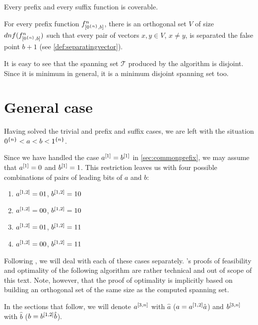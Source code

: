 \begin{corollary}
\label{corollary:prefixsuffixcoverable}
Every prefix and every suffix function is coverable.
\end{corollary}

\begin{corollary}
\label{corollary:prefixdependence}
For every prefix function $f^{n}_{[0^{\{n\}}, b]}$,
there is an orthogonal set $V$
of size $dnf(f^{n}_{[0^{\{n\}}, b]})$
such that
every pair of vectors $x,y \in V$, $x \neq y$,
is separated the false point $b+1$
(see \cref{def:separatingvector}).
\end{corollary}

It is easy to see that the spanning set $\mathcal{T}$
produced by the algorithm is disjoint.
Since it is minimum in general,
it is a minimum disjoint spanning set too.

\section{General case}
\label{sec:1intervalgeneral}

Having solved the trivial and prefix and suffix cases,
we are left with the situation
$0^{\{n\}} < a < b < 1^{\{n\}}$.

Since we have handled the case $a^{[1]} = b^{[1]}$
in \cref{sec:commonprefix},
we may assume that $a^{[1]} = 0$ and $b^{[1]} = 1$.
This restriction leaves us with
four possible combinations of pairs
of leading bits of $a$ and $b$:

\begin{enumerate}
\item $a^{[1, 2]} = 01$, $b^{[1, 2]} = 10$
\item $a^{[1, 2]} = 00$, $b^{[1, 2]} = 10$
\item $a^{[1, 2]} = 01$, $b^{[1, 2]} = 11$
\item $a^{[1, 2]} = 00$, $b^{[1, 2]} = 11$
\end{enumerate}

Following \citet{Schieber2005154},
we will deal with each of these cases separately.
\citeauthor{Schieber2005154}'s proofs of feasibility
and optimality of the following
algorithm are rather technical and out of scope
of this text.
Note, however, that the proof of optimality is implicitly
based on building an orthogonal set of the same size
as the computed spanning set.

In the sections that follow,
we will denote $a^{[3, n]}$ with $\hat{a}$
($a = a^{[1, 2]} \hat{a}$)
and $b^{[3, n]}$ with $\hat{b}$
($b = b^{[1, 2]} \hat{b}$).

